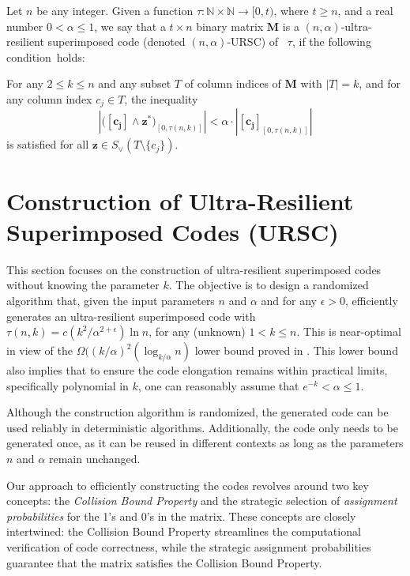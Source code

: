 \documentclass[11pt]{article}
\begin{document}
\begin{definition}
\label{def:shift_k_unknown-fuzzy}
Let $n$ be any integer.
Given a function $\tau: \mathbb{N} \times \mathbb{N} \to [0,t)$, where $t \ge n$, 
and a real number $0 < \alpha \le 1$, we say that  
a $t \times n$ binary matrix $\mathbf{M}$ is a $(n, \alpha)$-ultra-resilient   
superimposed code (denoted $(n, \alpha)$-URSC) of \elongation\ $\tau$, if the following condition~holds: 

For any $2\le k\le n$ and any subset $T$ of column indices of $\mathbf{M}$ with $|T| = k$, 
and for any column index $c_j \in T$, the inequality 
$$
\left| \Big(\mathbf{[c_{j}]} \wedge \mathbf{z^*} \Big)_{[0, \tau(n,k)]} \right| < \alpha \cdot \left|\mathbf{[c_j]}_{[0,\tau(n,k)]} \right|
$$
is satisfied for all $\mathbf{z} \in S_{\vee}(T \setminus \{c_j\})$. 

\end{definition}









\section{Construction of Ultra-Resilient Superimposed Codes (URSC)}
\label{sec:unknown-k}

This section focuses on the construction of ultra-resilient superimposed codes without knowing  
the parameter $k$. The objective is to design a randomized algorithm that, 
given the input parameters $n$ and $\alpha$ and for any $\epsilon > 0$,
efficiently generates an ultra-resilient superimposed code with \elongation\ 
$\tau(n,k) = c (k^2/ \alpha^{2+\epsilon})\ln n$, for any (unknown) $1 < k \le n$.
This is near-optimal in view of the $\Omega((k/\alpha)^2(\log_{k/\alpha} n)$ lower bound
proved in \cite{RV2024}.
This lower bound also implies that to ensure the code elongation remains within practical limits, 
specifically polynomial in $k$, one can reasonably assume that 
$e^{-k} < \alpha \le 1$.


Although the construction algorithm is randomized, the generated code can be used reliably in 
deterministic algorithms. Additionally, the code only needs to be generated once, as it can be reused 
in different contexts as long as the parameters $n$ and $\alpha$ remain unchanged.

Our approach to efficiently constructing the codes revolves 
around two key concepts: the \textit{Collision Bound Property} and the strategic selection of 
\textit{assignment probabilities} for the 1's and 0's in the matrix. These concepts are closely 
intertwined: the Collision Bound Property streamlines the computational verification of code correctness, 
while the strategic assignment probabilities guarantee that the matrix satisfies the Collision Bound Property.
\end{document}
